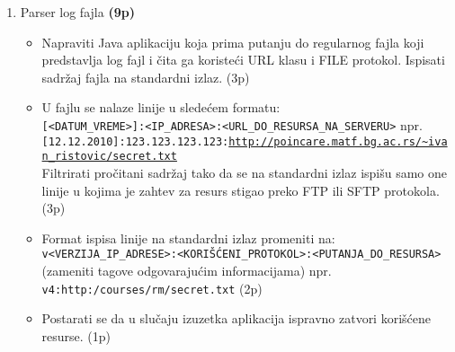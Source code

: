 \documentclass[]{article}
\begin{document}
\begin{enumerate}
  \item Parser log fajla \textbf{(9p)}
  \begin{itemize}
    \item Napraviti Java aplikaciju koja prima putanju do regularnog fajla koji predstavlja log fajl i \v{c}ita ga koriste\'c{}i URL klasu i FILE protokol. Ispisati sadr\v{z}aj fajla na standardni izlaz. \hfill (3p)
    \item U fajlu se nalaze linije u slede\'c{}em formatu:\\
    \texttt{[<DATUM\_VREME>]:<IP\_ADRESA>:<URL\_DO\_RESURSA\_NA\_SERVERU>} npr.\\
    \texttt{[12.12.2010]:123.123.123.123:\url{http://poincare.matf.bg.ac.rs/~ivan_ristovic/secret.txt}}\\
    Filtrirati pro\v{c}itani sadr\v{z}aj tako da se na standardni izlaz ispi\v{s}u samo one linije u kojima je zahtev za resurs stigao preko FTP ili SFTP protokola. \hfill (3p)
    \item Format ispisa linije na standardni izlaz promeniti na:\\
    \texttt{v<VERZIJA\_IP\_ADRESE>:<KORI\v{S}\'C{}ENI\_PROTOKOL>:<PUTANJA\_DO\_RESURSA>} (zameniti tagove odgovaraju\'c{}im informacijama) npr.\\
    \texttt{v4:http:/courses/rm/secret.txt} \hfill (2p)
    \item Postarati se da u slu\v{c}aju izuzetka aplikacija ispravno zatvori kori\v{s}\'c{}ene resurse. \hfill (1p)
  \end{itemize}
\end{enumerate}
\end{document}
